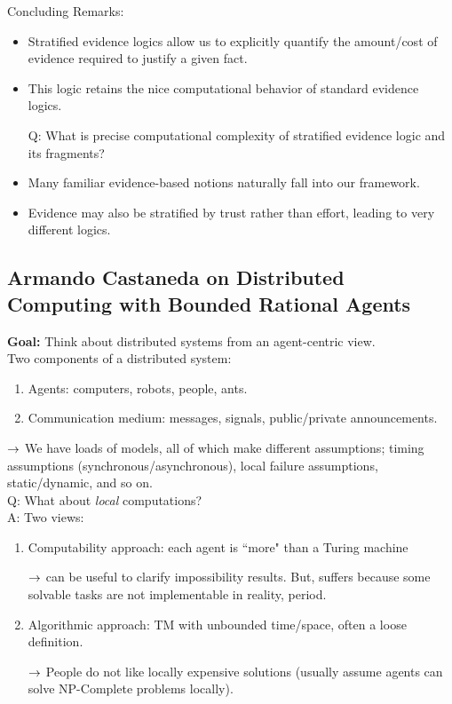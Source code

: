 Concluding Remarks:
\begin{itemize}
    \item Stratified evidence logics allow us to explicitly quantify the amount/cost of evidence required to justify a given fact.
    \item This logic retains the nice computational behavior of standard evidence logics.
    
    Q: What is precise computational complexity of stratified evidence logic and its fragments?
    
    \item Many familiar evidence-based notions naturally fall into our framework.
    
    \item Evidence may also be stratified by trust rather than effort, leading to very different logics.
\end{itemize}

\spacerule

\subsection{Armando Castaneda on Distributed
Computing with Bounded Rational Agents}

{\bf Goal:} Think about distributed systems from an agent-centric view. \\

Two components of a distributed system:
\begin{enumerate}
    \item Agents: computers, robots, people, ants.
    \item Communication medium: messages, signals, public/private announcements.
\end{enumerate}

$\rightarrow$ We have loads of models, all of which make different assumptions; timing assumptions (synchronous/asynchronous), local failure assumptions, static/dynamic, and so on. \\

Q: What about {\it local} computations?\\

A: Two views: 
\begin{enumerate}
    \item Computability approach: each agent is ``more" than a Turing machine
    
    $\rightarrow$ can be useful to clarify impossibility results. But, suffers because some solvable tasks are not implementable in reality, period.
    
    
    \item Algorithmic approach: TM with unbounded time/space, often a loose definition.
    
    $\rightarrow$ People do not like locally expensive solutions (usually assume agents can solve NP-Complete problems locally).
\end{enumerate}

